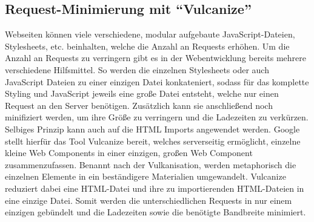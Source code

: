 \subsection{\texorpdfstring{Request-Minimierung mit ``Vulcanize''}{Request-Minimierung mit Vulcanize}}\label{request-minimierung-mit-vulcanize}

Webseiten können viele verschiedene, modular aufgebaute JavaScript-Dateien, Stylesheets, etc. beinhalten, welche die Anzahl an Requests erhöhen. Um die Anzahl an Requests zu verringern gibt es in der Webentwicklung bereits mehrere verschiedene Hilfsmittel. So werden die einzelnen Stylesheets oder auch JavaScript Dateien zu einer einzigen Datei konkateniert, sodass für das komplette Styling und JavaScript jeweils eine große Datei entsteht, welche nur einen Request an den Server benötigen. Zusätzlich kann sie anschließend noch minifiziert werden, um ihre Größe zu verringern und die Ladezeiten zu verkürzen. Selbiges Prinzip kann auch auf die \ac{HTML} Imports angewendet werden. Google stellt hierfür das Tool Vulcanize \cite{citeulike:13879681} bereit, welches serverseitig ermöglicht, einzelne kleine Web Components in einer einzigen, großen Web Component zusammenzufassen. Benannt nach der Vulkanisation, werden metaphorisch die einzelnen Elemente in ein beständigere Materialien umgewandelt. Vulcanize reduziert dabei eine \ac{HTML}-Datei und ihre zu importierenden \ac{HTML}-Dateien in eine einzige Datei. Somit werden die unterschiedlichen Requests in nur einem einzigen gebündelt und die Ladezeiten sowie die benötigte Bandbreite minimiert.

